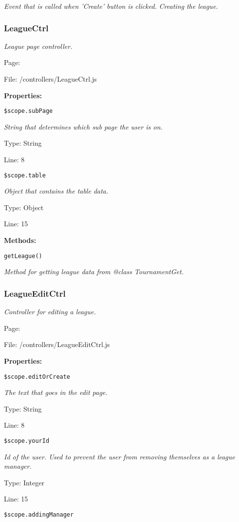 {\scriptsize
\textit{Event that is called when 'Create' button is clicked.
Creating the league.}

}

\subsubsection{LeagueCtrl}\label{LeagueCtrl.js.doc}
\textit{League page controller.}

Page: \pageref{LeagueCtrl.js}

File: /controllers/LeagueCtrl.js

\textbf{Properties:}

\texttt{\$scope.subPage}

{\scriptsize
\textit{String that determines which sub page the user is on.}

Type: String

Line: 8

}
\texttt{\$scope.table}

{\scriptsize
\textit{Object that contains the table data.}

Type: Object

Line: 15

}
\textbf{Methods:}

\texttt{getLeague()}

{\scriptsize
\textit{Method for getting league data from @class TournamentGet.}

}

\subsubsection{LeagueEditCtrl}\label{LeagueEditCtrl.js.doc}
\textit{Controller for editing a league.}

Page: \pageref{LeagueEditCtrl.js}

File: /controllers/LeagueEditCtrl.js

\textbf{Properties:}

\texttt{\$scope.editOrCreate}

{\scriptsize
\textit{The text that goes in the edit page.}

Type: String

Line: 8

}
\texttt{\$scope.yourId}

{\scriptsize
\textit{Id of the user.
Used to prevent the user from removing themselves as a league manager.}

Type: Integer

Line: 15

}
\texttt{\$scope.addingManager}


